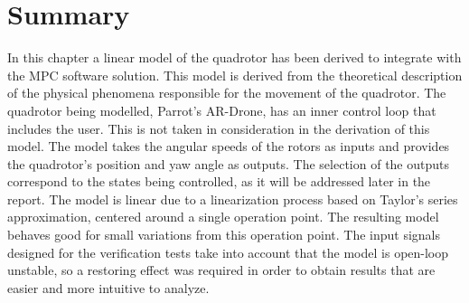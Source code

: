\section{Summary}

In this chapter a linear model of the quadrotor has been derived to integrate with the MPC software solution. This model is derived from the theoretical description of the physical phenomena responsible for the movement of the quadrotor. The quadrotor being modelled, Parrot's AR-Drone, has an inner control loop that includes the user. This is not taken in consideration in the derivation of this model. The model takes the angular speeds of the rotors as inputs and provides the quadrotor's position and yaw angle as outputs. The selection of the outputs correspond to the states being controlled, as it will be addressed later in the report. The model is linear due to a linearization process based on Taylor's series approximation, centered around a single operation point. The resulting model behaves good for small variations from this operation point. The input signals designed for the verification tests take into account that the model is open-loop unstable, so a restoring effect was required in order to obtain results that are easier and more intuitive to analyze. 

